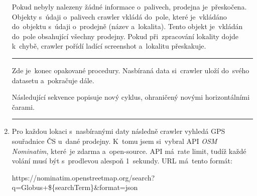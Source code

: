 \begin{enumerate}
        Pokud nebyly nalezeny žádné informace o~palivech, prodejna
        je~přeskočena. Objekty s~údaji o~palivech crawler vkládá do~pole,
        které je~vkládáno do~objektu s~údaji o~prodejně (název a~lokalita).
        Tento objekt je~vkládán do~pole obsahující všechny prodejny. Pokud
        při~zpracování lokality dojde k~chybě, crawler pořídí ladící screenshot
        a~lokalitu přeskakuje.
        \hrule
        Zde je~konec opakované procedury. Nasbíraná data si~crawler uloží
        do~svého datasetu a~pokračuje dále.
        
        Následující sekvence popisuje nový cyklus, ohraničený novými
        horizontálními čarami.
        \hrule
    \item Pro každou lokaci s~nasbíranými daty následně crawler vyhledá GPS
        souřadnice ČS u~dané prodejny. K~tomu jsem si~vybral API \emph{OSM
        Nominatim}, které~je zdarma a~open-source. API má~rate limit, tudíž
        každé volání musí být s~prodlevou alespoň 1~sekundy. URL má~tento
        formát:
        
        \begin{tt}
            \centering
            https://nominatim.openstreetmap.org/search?q=Globus+\$\{searchTerm\}\&format=json
        \end{tt}
        

\end{enumerate}
